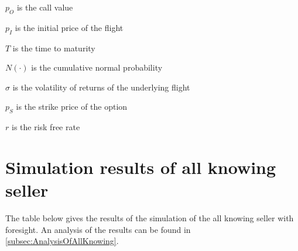 \begin{compactdesc}
\item[$p_O$] is the call value
\item[$p_I$] is the initial price of the flight
\item[$T$] is the time to maturity
\item[$N(\cdot)$] is the cumulative normal probability
\item[$\sigma$] is the volatility of returns of the underlying flight
\item[$p_S$] is the strike price of the option
\item[$r$] is the risk free rate
\vspace{1ex}
\end{compactdesc}



\chapter{Simulation results of all knowing seller}
\label{app:SimulationResultsAllKnowingSeller}
The table below gives the results of the simulation of the all knowing seller with foresight. An analysis of the results can be found in \autoref{subsec:AnalysisOfAllKnowing}.
\\[2em]
